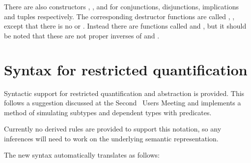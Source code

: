\noindent There are also constructors
,
,
 and
for conjunctions, disjunctions, implications and tuples respectively.
The corresponding destructor functions are called , \etc,
except that there is no  or . Instead there are
functions called  and , but it should be noted
that these are not proper inverses of  and
.


\section{Syntax for restricted quantification}\label{res-quant}

Syntactic support for restricted quantification and abstraction is 
provided. This follows a suggestion discussed at the Second \HOL\ Users
Meeting and implements a method of simulating subtypes and dependent
types with predicates. 

Currently no derived rules are provided to support this notation, so
any inferences will need to work on the underlying semantic
representation.

The new syntax automatically translates as follows:

\begin{hol}
{\small\verb%   \%}$v${\small\verb%::%}$P${\small\verb%.%}$B${\small\verb%    <---->   RES_ABSTRACT %}$P${\small\verb% (\%}$v${\small\verb%.%}$B${\small\verb%)%}\\
{\small\verb%   !%}$v${\small\verb%::%}$P${\small\verb%.%}$B${\small\verb%    <---->   RES_FORALL   %}$P${\small\verb% (\%}$v${\small\verb%.%}$B${\small\verb%)%}\\
{\small\verb%   ?%}$v${\small\verb%::%}$P${\small\verb%.%}$B${\small\verb%    <---->   RES_EXISTS   %}$P${\small\verb% (\%}$v${\small\verb%.%}$B${\small\verb%)%}\\
{\small\verb%   @%}$v${\small\verb%::%}$P${\small\verb%.%}$B${\small\verb%    <---->   RES_SELECT   %}$P${\small\verb% (\%}$v${\small\verb%.%}$B${\small\verb%)%}
\end{hol}


